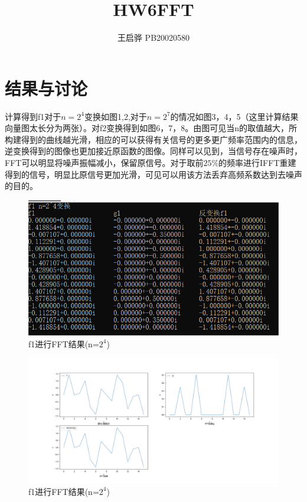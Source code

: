 \documentclass{article}
\title{\songti \zihao{2}\bfseries HW6FFT}
\author{王启骅 PB20020580}
\begin{document}
	\maketitle
\section{结果与讨论}
计算得到f1对于$n=2^4$变换如图1,2,对于$ n=2^7 $的情况如图3，4，5（这里计算结果向量图太长分为两张）。对f2变换得到如图6，7，8。由图可见当n的取值越大，所构建得到的曲线越光滑，相应的可以获得有关信号的更多更广频率范围内的信息，逆变换得到的图像也更加接近原函数的图像。同样可以见到，当信号存在噪声时，FFT可以明显将噪声振幅减小，保留原信号。对于取前$ 25\% $的频率进行IFFT重建得到的信号，明显比原信号更加光滑，可见可以用该方法丢弃高频系数达到去噪声的目的。
\begin{figure}[!h]
	
	\centering
	\includegraphics[scale=0.4]{f1}
	\caption{\heiti{}f1进行FFT结果(n=$ 2^4 $)}
	\label{fig:1}
\end{figure}
	\begin{figure}[!h]
	
	\centering
	\includegraphics[scale=0.4]{f_1_4}
	\caption{\heiti{}f1进行FFT结果(n=$ 2^4 $)}
	\label{fig:2}
\end{figure}
\end{document}

